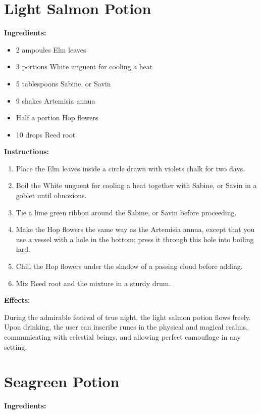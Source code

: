 \documentclass{article}
\begin{document}
\newpage
\section*{Light Salmon Potion}

\textbf{Ingredients:}

\begin{itemize}
  \item 2 ampoules Elm leaves
  \item 3 portions White unguent for cooling a heat
  \item 5 tablespoons Sabine, or Savin
  \item 9 shakes Artemisia annua
  \item Half a portion Hop flowers
  \item 10 drops Reed root
\end{itemize}

\textbf{Instructions:}

\begin{enumerate}
  \item Place the Elm leaves inside a circle drawn with violets chalk for two days.
  \item Boil the White unguent for cooling a heat together with Sabine, or Savin in a goblet until obnoxious.
  \item Tie a lime green ribbon around the Sabine, or Savin before proceeding.
  \item Make the Hop flowers the same way as the Artemisia annua, except that you use a vessel with a hole in the bottom; press it through this hole into boiling lard.
  \item Chill the Hop flowers under the shadow of a passing cloud before adding.
  \item Mix Reed root and the mixture in a sturdy drum.
\end{enumerate}

\textbf{Effects:}

During the admirable festival of true night, the light salmon potion flows freely. Upon drinking, the user can inscribe runes in the physical and magical realms, communicating with celestial beings, and allowing perfect camouflage in any setting.

\newpage
\section*{Seagreen Potion}

\textbf{Ingredients:}
\end{document}
